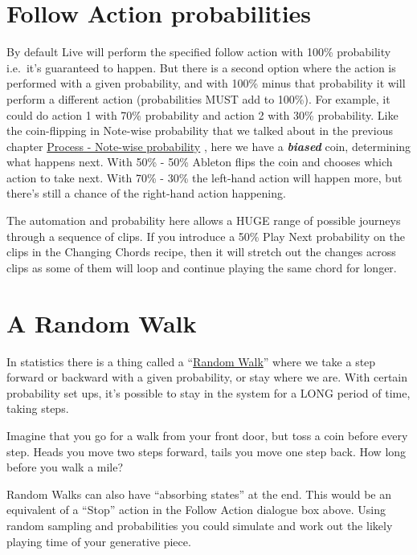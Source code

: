 \documentclass[
  12pt,
  letterpaper,
  oneside,
  open=any]{scrbook}
\begin{document}
\section{Follow Action probabilities}\label{follow-action-probabilities}

By default Live will perform the specified follow action with 100\%
probability i.e.~it's guaranteed to happen. But there is a second option
where the action is performed with a given probability, and with 100\%
minus that probability it will perform a different action (probabilities
MUST add to 100\%). For example, it could do action 1 with 70\%
probability and action 2 with 30\% probability. Like the coin-flipping
in Note-wise probability that we talked about in the previous chapter
\hyperref[Chapter-002-Process-Note_wise_probability]{Process - Note-wise
probability} , here we have a \textbf{\emph{biased}} coin, determining
what happens next. With 50\% - 50\% Ableton flips the coin and chooses
which action to take next. With 70\% - 30\% the left-hand action will
happen more, but there's still a chance of the right-hand action
happening.

The automation and probability here allows a HUGE range of possible
journeys through a sequence of clips. If you introduce a 50\% Play Next
probability on the clips in the Changing Chords recipe, then it will
stretch out the changes across clips as some of them will loop and
continue playing the same chord for longer.

\section{A Random Walk}\label{a-random-walk}

In statistics there is a thing called a
``\href{https://en.wikipedia.org/wiki/Random_walk}{Random Walk}'' where
we take a step forward or backward with a given probability, or stay
where we are. With certain probability set ups, it's possible to stay in
the system for a LONG period of time, taking steps.

Imagine that you go for a walk from your front door, but toss a coin
before every step. Heads you move two steps forward, tails you move one
step back. How long before you walk a mile?

Random Walks can also have ``absorbing states'' at the end. This would
be an equivalent of a ``Stop'' action in the Follow Action dialogue box
above. Using random sampling and probabilities you could simulate and
work out the likely playing time of your generative piece.
\end{document}
